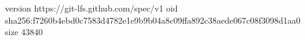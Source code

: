 version https://git-lfs.github.com/spec/v1
oid sha256:f7260b4ebd0c7583d4782e1e9b9b04a8c09ffa892c38aede067c08f3098d1aa0
size 43840
